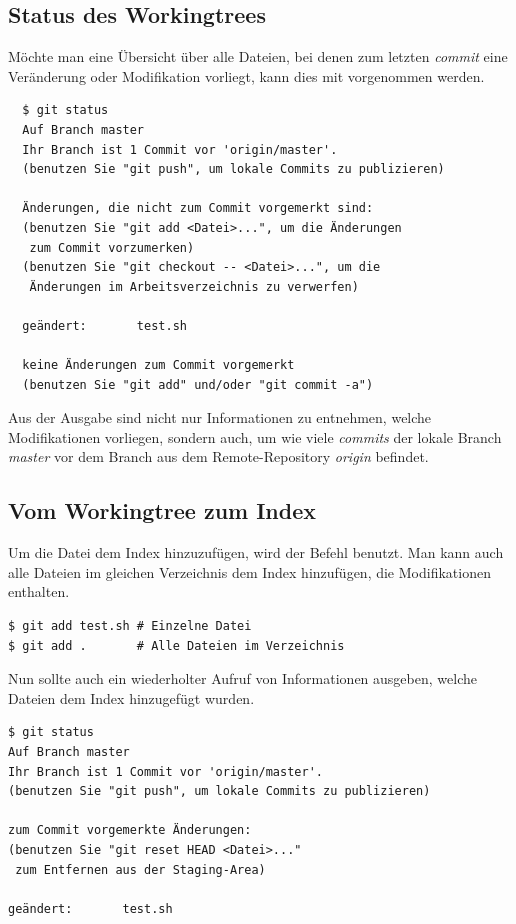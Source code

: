 \subsection{Status des Workingtrees}
\label{sec:work-with-git.workingtree-status}
Möchte man eine Übersicht über alle Dateien, bei denen zum letzten \textit{commit} eine Veränderung oder Modifikation vorliegt, kann dies mit \textit{} vorgenommen werden.

\begin{verbatim}
  $ git status
  Auf Branch master
  Ihr Branch ist 1 Commit vor 'origin/master'.
  (benutzen Sie "git push", um lokale Commits zu publizieren)

  Änderungen, die nicht zum Commit vorgemerkt sind:
  (benutzen Sie "git add <Datei>...", um die Änderungen
   zum Commit vorzumerken)
  (benutzen Sie "git checkout -- <Datei>...", um die
   Änderungen im Arbeitsverzeichnis zu verwerfen)

  geändert:       test.sh

  keine Änderungen zum Commit vorgemerkt
  (benutzen Sie "git add" und/oder "git commit -a")
\end{verbatim}

Aus der Ausgabe sind nicht nur Informationen zu entnehmen, welche Modifikationen vorliegen, sondern auch, um wie viele \textit{commits} der lokale Branch \textit{master} vor dem Branch  aus dem Remote-Repository \textit{origin} befindet.

\subsection{Vom Workingtree zum Index}
\label{sec:work-with-git.workingtree-to-index}
Um die Datei dem Index hinzuzufügen, wird der Befehl \textit{} benutzt. Man kann auch alle Dateien im gleichen Verzeichnis dem Index hinzufügen, die Modifikationen enthalten.

\begin{verbatim}
$ git add test.sh # Einzelne Datei
$ git add .       # Alle Dateien im Verzeichnis
\end{verbatim}

Nun sollte auch ein wiederholter Aufruf von \textit{} Informationen ausgeben, welche Dateien dem Index hinzugefügt wurden.

\begin{verbatim}
$ git status
Auf Branch master
Ihr Branch ist 1 Commit vor 'origin/master'.
(benutzen Sie "git push", um lokale Commits zu publizieren)

zum Commit vorgemerkte Änderungen:
(benutzen Sie "git reset HEAD <Datei>..."
 zum Entfernen aus der Staging-Area)

geändert:       test.sh
\end{verbatim}


